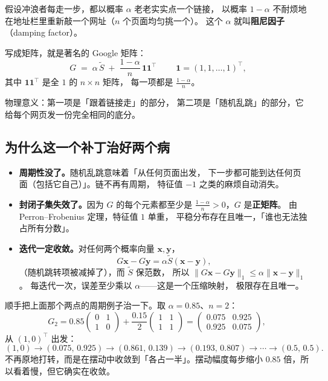 \documentclass[UTF8,11pt,fontset=macnew]{ctexart}
\newcommand{\xv}{\mathbf{x}}
\newcommand{\one}{\mathbf{1}}
\begin{document}
假设冲浪者每走一步，都以概率 $\alpha$ 老老实实点一个链接，
以概率 $1-\alpha$ 不耐烦地在地址栏里重新敲一个网址（$n$ 个页面均匀挑一个）。
这个 $\alpha$ 就叫\textbf{阻尼因子}（damping factor）。

写成矩阵，就是著名的 Google 矩阵：
\[
\boxed{\;G \;=\; \alpha\,\tilde S \;+\; \frac{1-\alpha}{n}\,\one\one^\top\;}
\qquad
\one=(1,1,\dots,1)^\top,
\]
其中 $\one\one^\top$ 是全 $1$ 的 $n\times n$ 矩阵，
每一项都是 $\frac{1-\alpha}{n}$。

物理意义：第一项是「跟着链接走」的部分，
第二项是「随机乱跳」的部分，它给每个网页发一份完全相同的底分。

\subsection{为什么这一个补丁治好两个病}

\begin{itemize}
  \item \textbf{周期性没了。}随机乱跳意味着「从任何页面出发，
        下一步都可能到达任何页面（包括它自己）」。链不再有周期，
        特征值 $-1$ 之类的麻烦自动消失。
  \item \textbf{封闭子集失效了。}因为 $G$ 的每个元素都至少是
        $\frac{1-\alpha}{n}>0$，$G$ 是\textbf{正矩阵}。
        由 Perron--Frobenius 定理，特征值 $1$ 单重，
        平稳分布存在且唯一，「谁也无法独占所有分数」。
  \item \textbf{迭代一定收敛。}对任何两个概率向量 $\xv,\mathbf{y}$，
        \[
        G\xv-G\mathbf{y}=\alpha\tilde S(\xv-\mathbf{y}),
        \]
        （随机跳转项被减掉了），而 $\tilde S$ 保范数，
        所以 $\|G\xv-G\mathbf{y}\|_1\le \alpha\|\xv-\mathbf{y}\|_1$。
        每迭代一次，误差至少乘以 $\alpha$——这是一个压缩映射，
        极限存在且唯一。
\end{itemize}

顺手把上面那个两点的周期例子治一下。取 $\alpha=0.85$、$n=2$：
\[
G_2=0.85\begin{pmatrix}0&1\\1&0\end{pmatrix}
   +\frac{0.15}{2}\begin{pmatrix}1&1\\1&1\end{pmatrix}
   =\begin{pmatrix}0.075&0.925\\0.925&0.075\end{pmatrix},
\]
从 $(1,0)^\top$ 出发：
\[
(1,0)\to(0.075,\,0.925)\to(0.861,\,0.139)\to(0.193,\,0.807)\to\cdots\to(0.5,\,0.5).
\]
不再原地打转，而是在摆动中收敛到「各占一半」。摆动幅度每步缩小
$0.85$ 倍，所以看着慢，但它确实在收敛。
\end{document}
